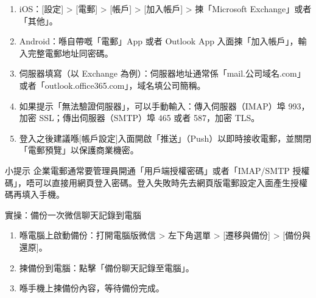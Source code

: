 
\begin{enumerate}
  \item iOS：[設定] > [電郵] > [帳戶] > [加入帳戶] > 揀「Microsoft Exchange」或者「其他」。
  \item Android：喺自帶嘅「電郵」App 或者 Outlook App 入面揀「加入帳戶」，輸入完整電郵地址同密碼。
  \item 伺服器填寫（以 Exchange 為例）：伺服器地址通常係「mail.公司域名.com」或者「outlook.office365.com」，域名填公司簡稱。
  \item 如果提示「無法驗證伺服器」，可以手動輸入：傳入伺服器（IMAP）埠 993，加密 SSL；傳出伺服器（SMTP）埠 465 或者 587，加密 TLS。
  \item 登入之後建議喺[帳戶設定]入面開啟「推送」（Push）以即時接收電郵，並關閉「電郵預覽」以保護商業機密。
\end{enumerate}

\begin{tcbinfo}{小提示}
企業電郵通常要管理員開通「用戶端授權密碼」或者「IMAP/SMTP 授權碼」，唔可以直接用網頁登入密碼。登入失敗時先去網頁版電郵設定入面產生授權碼再填入手機。

\end{tcbinfo}

\begin{tcbpractice}{實操：備份一次微信聊天記錄到電腦}
\begin{enumerate}
  \item 喺電腦上啟動備份：打開電腦版微信 > 左下角選單 > [遷移與備份] > [備份與還原]。
  \item 揀備份到電腦：點擊「備份聊天記錄至電腦」。
  \item 喺手機上揀備份內容，等待備份完成。
\end{enumerate}

\end{tcbpractice}
